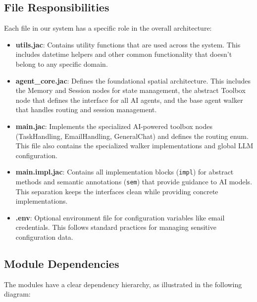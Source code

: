 \subsection{File Responsibilities}

Each file in our system has a specific role in the overall architecture:

\begin{itemize}
\item \textbf{utils.jac}: Contains utility functions that are used across the system. This includes datetime helpers and other common functionality that doesn't belong to any specific domain.

\item \textbf{agent\_core.jac}: Defines the foundational spatial architecture. This includes the Memory and Session nodes for state management, the abstract Toolbox node that defines the interface for all AI agents, and the base agent walker that handles routing and session management.

\item \textbf{main.jac}: Implements the specialized AI-powered toolbox nodes (TaskHandling, EmailHandling, GeneralChat) and defines the routing enum. This file also contains the specialized walker implementations and global LLM configuration.

\item \textbf{main.impl.jac}: Contains all implementation blocks (\texttt{impl}) for abstract methods and semantic annotations (\texttt{sem}) that provide guidance to AI models. This separation keeps the interfaces clean while providing concrete implementations.

\item \textbf{.env}: Optional environment file for configuration variables like email credentials. This follows standard practices for managing sensitive configuration data.
\end{itemize}

\subsection{Module Dependencies}

The modules have a clear dependency hierarchy, as illustrated in the following diagram:

